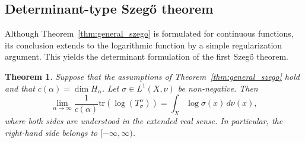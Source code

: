 \documentclass{amsart}
\newtheorem{thm}{Theorem}[section]
\theoremstyle{definition}
\theoremstyle{remark}
\numberwithin{equation}{section}
\begin{document}

\subsection{Determinant-type Szeg\H{o} theorem}

Although Theorem~\ref{thm:general_szego} is formulated for continuous functions, its
conclusion extends to the logarithmic function by a simple
regularization argument.  This yields the determinant formulation of
the first Szeg\H{o} theorem.

\begin{thm}\label{thm:determinant_szego}
Suppose that the assumptions of Theorem~\ref{thm:general_szego} hold and that
$c(\alpha)=\dim H_\alpha$.  Let $\sigma\in L^1(X,\nu)$ be non-negative. Then
\[
 \lim_{\alpha\to\infty}
 \frac{1}{c(\alpha)}
 \text{tr}\left( \log\left(T_\sigma^\alpha\right)\right)
 =
 \int_X \log\sigma(x)\,d\nu(x),
\]
where both sides are understood in the extended real sense. In
particular, the right-hand side belongs to $[-\infty,\infty)$.
\end{thm}
\end{document}
